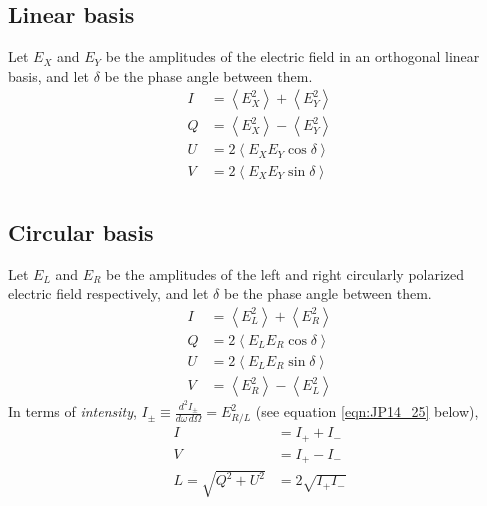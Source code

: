 \documentclass{book}
\begin{document}
\subsection{Linear basis}

Let $E_X$ and $E_Y$ be the amplitudes of the electric field in an orthogonal linear basis, and let $\delta$ be the phase angle between them.
\begin{equation}
    \begin{aligned}
        I &= \left\langle E_X^2 \right\rangle + \left\langle E_Y^2 \right\rangle \\
        Q &= \left\langle E_X^2 \right\rangle - \left\langle E_Y^2 \right\rangle \\
        U &= 2\left\langle E_X E_Y \cos\delta \right\rangle \\
        V &= 2\left\langle E_X E_Y \sin\delta \right\rangle \\
    \end{aligned}
\end{equation}

\subsection{Circular basis}

Let $E_L$ and $E_R$ be the amplitudes of the left and right circularly polarized electric field respectively, and let $\delta$ be the phase angle between them.
\begin{equation}
    \begin{aligned}
        I &= \left\langle E_L^2 \right\rangle + \left\langle E_R^2 \right\rangle \\
        Q &= 2\left\langle E_L E_R \cos\delta \right\rangle \\
        U &= 2\left\langle E_L E_R \sin\delta \right\rangle \\
        V &= \left\langle E_R^2 \right\rangle - \left\langle E_L^2 \right\rangle
    \end{aligned}
\end{equation}
In terms of \emph{intensity}, $I_\pm \equiv \frac{d^2I_\pm}{d\omega\,d\Omega} = E_{R/L}^2$ (see equation \ref{eqn:JP14_25} below),
\begin{equation}
    \begin{aligned}
        I &= I_+ + I_- \\
        V &= I_+ - I_- \\
        L = \sqrt{Q^2 + U^2} &= 2\sqrt{I_+ I_-}
    \end{aligned}
\end{equation}
\end{document}
